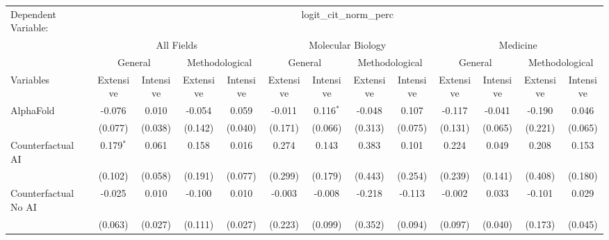 \begingroup
\centering
\begin{tabular}{lcccccccccccc}
   \tabularnewline \midrule \midrule
   Dependent Variable: & \multicolumn{12}{c}{logit\_cit\_norm\_perc}\\
 & \multicolumn{4}{c}{All Fields} & \multicolumn{4}{c}{Molecular Biology} & \multicolumn{4}{c}{Medicine} \\
\cmidrule(lr){2-5} \cmidrule(lr){6-9} \cmidrule(lr){10-13}
 & \multicolumn{2}{c}{General} & \multicolumn{2}{c}{Methodological} & \multicolumn{2}{c}{General} & \multicolumn{2}{c}{Methodological} & \multicolumn{2}{c}{General} & \multicolumn{2}{c}{Methodological} \\
\cmidrule(lr){2-3} \cmidrule(lr){4-5} \cmidrule(lr){6-7} \cmidrule(lr){8-9} \cmidrule(lr){10-11} \cmidrule(lr){12-13}
Variables & \multicolumn{1}{c}{Extensive} & \multicolumn{1}{c}{Intensive} & \multicolumn{1}{c}{Extensive} & \multicolumn{1}{c}{Intensive} & \multicolumn{1}{c}{Extensive} & \multicolumn{1}{c}{Intensive} & \multicolumn{1}{c}{Extensive} & \multicolumn{1}{c}{Intensive} & \multicolumn{1}{c}{Extensive} & \multicolumn{1}{c}{Intensive} & \multicolumn{1}{c}{Extensive} & \multicolumn{1}{c}{Intensive} \\
\cmidrule(lr){1-1}\cmidrule(lr){2-2} \cmidrule(lr){3-3} \cmidrule(lr){4-4} \cmidrule(lr){5-5} \cmidrule(lr){6-6} \cmidrule(lr){7-7} \cmidrule(lr){8-8} \cmidrule(lr){9-9} \cmidrule(lr){10-10} \cmidrule(lr){11-11} \cmidrule(lr){12-12} \cmidrule(lr){13-13}
   AlphaFold                                & -0.076       & 0.010   & -0.054  & 0.059   & -0.011  & 0.116$^{*}$   & -0.048  & 0.107   & -0.117  & -0.041  & -0.190  & 0.046\\   
                                            & (0.077)      & (0.038) & (0.142) & (0.040) & (0.171) & (0.066)       & (0.313) & (0.075) & (0.131) & (0.065) & (0.221) & (0.065)\\   
   Counterfactual AI                        & 0.179$^{*}$  & 0.061   & 0.158   & 0.016   & 0.274   & 0.143         & 0.383   & 0.101   & 0.224   & 0.049   & 0.208   & 0.153\\   
                                            & (0.102)      & (0.058) & (0.191) & (0.077) & (0.299) & (0.179)       & (0.443) & (0.254) & (0.239) & (0.141) & (0.408) & (0.180)\\   
   Counterfactual No AI                     & -0.025       & 0.010   & -0.100  & 0.010   & -0.003  & -0.008        & -0.218  & -0.113  & -0.002  & 0.033   & -0.101  & 0.029\\   
                                            & (0.063)      & (0.027) & (0.111) & (0.027) & (0.223) & (0.099)       & (0.352) & (0.094) & (0.097) & (0.040) & (0.173) & (0.045)\\   

\end{tabular}
